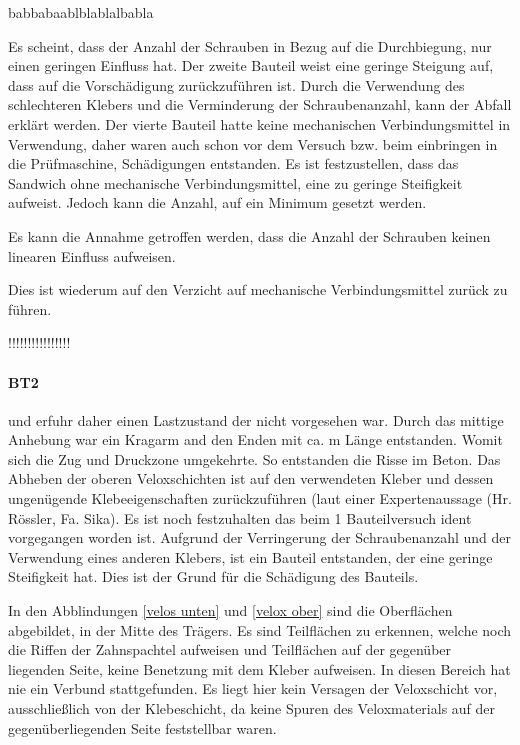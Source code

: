 \documentclass[12 pt,a4 paper ]{scrreprt}
\begin{document}
\newpage 
babbabaablblablalbabla\cite{WRT}
 
 



Es scheint, dass der Anzahl der Schrauben in Bezug auf die Durchbiegung, nur einen geringen Einfluss hat. Der zweite Bauteil weist eine geringe Steigung auf, dass auf die Vorschädigung zurückzuführen ist. Durch die Verwendung des schlechteren Klebers und die Verminderung der Schraubenanzahl, kann der Abfall erklärt werden. Der vierte Bauteil hatte keine mechanischen Verbindungsmittel in Verwendung, daher waren auch schon vor dem Versuch bzw. beim einbringen in die Prüfmaschine, Schädigungen entstanden. 
Es ist festzustellen, dass das Sandwich ohne mechanische Verbindungsmittel, eine zu geringe Steifigkeit aufweist. Jedoch kann die Anzahl, auf ein Minimum gesetzt werden.


 Es kann die Annahme getroffen werden, dass die Anzahl der Schrauben keinen linearen Einfluss aufweisen.


Dies ist wiederum auf den Verzicht auf mechanische Verbindungsmittel zurück zu führen.






!!!!!!!!!!!!!!!!
\paragraph{BT2}
und erfuhr daher einen Lastzustand der nicht vorgesehen war. Durch das mittige Anhebung war ein Kragarm and den Enden  mit ca. \unit[2,0]{m} Länge entstanden. Womit sich die Zug und Druckzone umgekehrte. So entstanden die Risse im Beton. Das Abheben der oberen Veloxschichten ist auf den verwendeten Kleber und dessen ungenügende Klebeeigenschaften zurückzuführen (laut einer Expertenaussage (Hr. Rössler, Fa. Sika).
Es ist noch festzuhalten das beim 1 Bauteilversuch ident vorgegangen worden ist. Aufgrund der Verringerung der Schraubenanzahl und der Verwendung eines anderen Klebers, ist ein Bauteil entstanden, der eine geringe Steifigkeit hat. Dies ist der Grund für die Schädigung des Bauteils.





In den Abblindungen \ref{velos unten} und \ref{velox ober} sind die Oberflächen abgebildet, in der Mitte des Trägers. Es sind Teilflächen zu erkennen, welche noch die Riffen der Zahnspachtel aufweisen und Teilflächen auf der gegenüber liegenden Seite, keine Benetzung mit dem Kleber aufweisen. In diesen Bereich hat nie ein Verbund stattgefunden. Es liegt hier kein Versagen der Veloxschicht vor, ausschließlich von der Klebeschicht, da keine Spuren des Veloxmaterials auf der gegenüberliegenden Seite feststellbar waren. 
\end{document}
